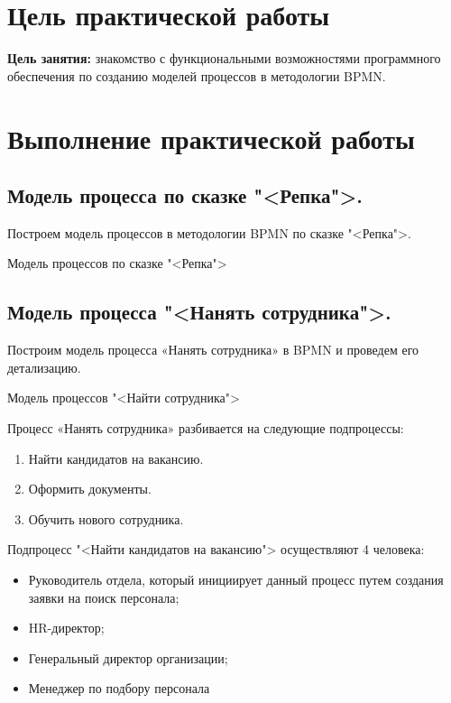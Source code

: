 \graphicspath{{./img/}}

\section{Цель практической работы}
\textbf{Цель занятия:}
знакомство с функциональными возможностями программного
обеспечения по созданию моделей процессов в методологии BPMN.

\clearpage

\section{Выполнение практической работы}
\subsection{Модель процесса по сказке "<Репка">.}
Построем модель процессов в методологии BPMN по сказке "<Репка">.

\begin{image}
	\caption{Модель процессов по сказке "<Репка">}
\end{image}

\subsection{Модель процесса "<Нанять сотрудника">.}
Построим модель процесса «Нанять сотрудника» в BPMN и проведем его
детализацию.

\begin{image}
	\caption{Модель процессов "<Найти сотрудника">}
\end{image}

Процесс «Нанять сотрудника» разбивается на следующие подпроцессы:

\begin{enumerate}
	\item Найти кандидатов на вакансию.
	\item Оформить документы.
	\item Обучить нового сотрудника.
\end{enumerate}

Подпроцесс "<Найти кандидатов на вакансию"> осуществляют 4 человека:

\begin{itemize}
	\item Руководитель отдела, который инициирует данный процесс
	путем создания заявки на поиск персонала;
	\item HR-директор;
	\item Генеральный директор организации;
	\item Менеджер по подбору персонала
\end{itemize}

